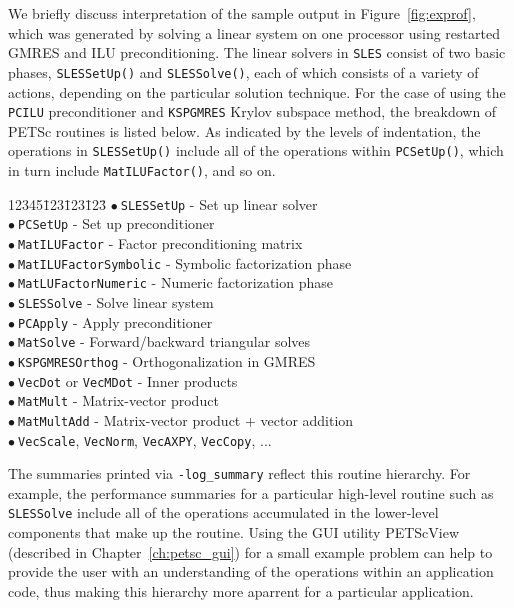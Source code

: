 {We briefly discuss interpretation of the sample output in
Figure~\ref{fig:exprof}, which was generated by solving a linear
system on one processor using restarted GMRES and ILU
preconditioning.  The linear solvers in {\tt SLES} consist of two
basic phases, {\tt SLESSetUp()} and {\tt SLESSolve()}, each of which
consists of a variety of actions, depending on the particular
solution technique.
For the case of using the {\tt PCILU} preconditioner and {\tt KSPGMRES}
Krylov subspace method, the breakdown of PETSc routines is listed below.
As indicated by the levels of indentation, the
operations in {\tt SLESSetUp()} include all of the operations within
{\tt PCSetUp()}, which in turn include {\tt MatILUFactor()}, and so on. 
\newcommand{\bu}{$\bullet \: $}
\begin{tabbing}
12345\=123\=123\=123\= \kill
\> \bu {\tt SLESSetUp} - Set up linear solver\\
\>\> \bu {\tt PCSetUp} - Set up preconditioner\\
\>\>\> \bu {\tt MatILUFactor} - Factor preconditioning matrix\\
\>\>\>\> \bu {\tt MatILUFactorSymbolic} - Symbolic factorization phase\\
\>\>\>\> \bu {\tt MatLUFactorNumeric} - Numeric factorization phase\\
\> \bu {\tt SLESSolve} - Solve linear system\\
\>\> \bu {\tt PCApply} - Apply preconditioner\\
\>\>\> \bu {\tt MatSolve} - Forward/backward triangular solves\\
\>\> \bu {\tt KSPGMRESOrthog} - Orthogonalization in GMRES\\
\>\>\> \bu {\tt VecDot} or {\tt VecMDot} - Inner products\\
\>\> \bu {\tt MatMult} - Matrix-vector product\\
\>\> \bu {\tt MatMultAdd} - Matrix-vector product + vector addition\\
\>\> \bu  {\tt VecScale}, {\tt VecNorm}, {\tt VecAXPY}, {\tt VecCopy}, ...\\
\end{tabbing}

The summaries printed via {\tt -log\_summary} reflect this 
routine hierarchy. For example, the performance summaries for a
particular high-level routine such as {\tt SLESSolve} include all of
the operations accumulated in the lower-level components that
make up the routine.  Using the GUI utility PETScView
(described in Chapter~\ref{ch:petsc_gui}) for a small example problem can
help to provide the user with an understanding of the operations
within an application code, thus making this hierarchy more aparrent
for a particular application.

}
